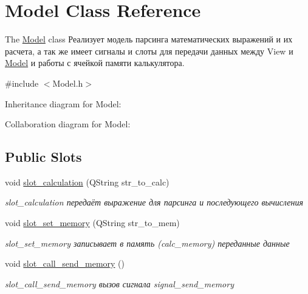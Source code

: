 \hypertarget{classModel}{}\section{Model Class Reference}
\label{classModel}


The \hyperlink{classModel}{Model} class Реализует модель парсинга математических выражений и их расчета, а так же имеет сигналы и слоты для передачи данных между View и \hyperlink{classModel}{Model} и работы с ячейкой памяти калькулятора.  




{\ttfamily \#include $<$Model.\+h$>$}



Inheritance diagram for Model\+:


Collaboration diagram for Model\+:
\subsection*{Public Slots}
\begin{DoxyCompactItemize}
\item 
void \hyperlink{classModel_af98ce135ec46ccd3b4c226ffe6856862}{slot\+\_\+calculation} (Q\+String str\+\_\+to\+\_\+calc)
\begin{DoxyCompactList}\small\item\em slot\+\_\+calculation передаёт выражение для парсинга и последующего вычисления \end{DoxyCompactList}\item 
void \hyperlink{classModel_a842728451398305a2f21e4981a1151e0}{slot\+\_\+set\+\_\+memory} (Q\+String str\+\_\+to\+\_\+mem)
\begin{DoxyCompactList}\small\item\em slot\+\_\+set\+\_\+memory записывает в память (calc\+\_\+memory) переданные данные \end{DoxyCompactList}\item 
void \hyperlink{classModel_ae0eec66cb929e57fa2c2cce7701d8ed4}{slot\+\_\+call\+\_\+send\+\_\+memory} ()
\begin{DoxyCompactList}\small\item\em slot\+\_\+call\+\_\+send\+\_\+memory вызов сигнала signal\+\_\+send\+\_\+memory \end{DoxyCompactList}\end{DoxyCompactItemize}

